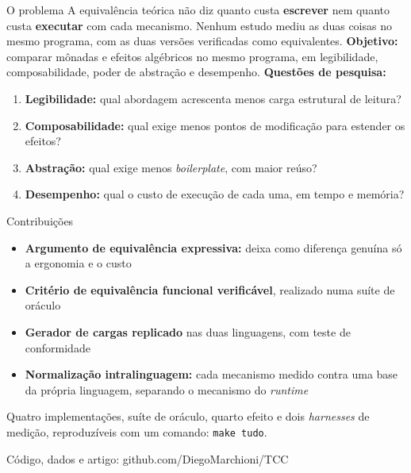 \documentclass[aspectratio=169,10pt,xcolor={table}]{beamer}
\newcommand{\fonte}[1]{\par\vfill{\fontsize{7}{9}\selectfont\color{rodape}#1\par}\vskip1mm}
\begin{document}
\begin{frame}{O problema}
  A equivalência teórica não diz quanto custa \textbf{escrever} nem quanto custa
  \textbf{executar} com cada mecanismo. Nenhum estudo mediu as duas coisas no mesmo
  programa, com as duas versões verificadas como equivalentes.
  \vskip4mm
  \textbf{Objetivo:} comparar mônadas e efeitos algébricos no mesmo programa, em
  legibilidade, composabilidade, poder de abstração e desempenho.
  \vskip3mm
  \textbf{Questões de pesquisa:}
  \begin{enumerate}
    \item \textbf{Legibilidade:} qual abordagem acrescenta menos carga estrutural de leitura?
    \item \textbf{Composabilidade:} qual exige menos pontos de modificação para estender os efeitos?
    \item \textbf{Abstração:} qual exige menos \emph{boilerplate}, com maior reúso?
    \item \textbf{Desempenho:} qual o custo de execução de cada uma, em tempo e memória?
  \end{enumerate}
\end{frame}

\begin{frame}{Contribuições}
  \begin{itemize}
    \item \textbf{Argumento de equivalência expressiva:} deixa como diferença genuína só a ergonomia e o custo
    \item \textbf{Critério de equivalência funcional verificável}, realizado numa suíte de oráculo
    \item \textbf{Gerador de cargas replicado} nas duas linguagens, com teste de conformidade
    \item \textbf{Normalização intralinguagem:} cada mecanismo medido contra uma base da própria linguagem, separando o mecanismo do \emph{runtime}
  \end{itemize}
  \vskip4mm
  Quatro implementações, suíte de oráculo, quarto efeito e dois \emph{harnesses} de medição,
  reproduzíveis com um comando: \texttt{make tudo}.
  \fonte{Código, dados e artigo: github.com/DiegoMarchioni/TCC}
\end{frame}
\end{document}

